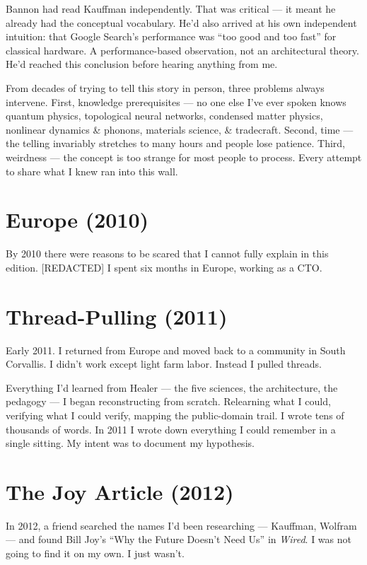 Bannon had read Kauffman independently. That was critical --- it meant he already had the conceptual vocabulary. He'd also arrived at his own independent intuition: that Google Search's performance was ``too good and too fast'' for classical hardware. A performance-based observation, not an architectural theory. He'd reached this conclusion before hearing anything from me.


From decades of trying to tell this story in person, three problems always intervene. First, knowledge prerequisites --- no one else I've ever spoken knows quantum physics, topological neural networks, condensed matter physics, nonlinear dynamics \& phonons, materials science, \& tradecraft. Second, time --- the telling invariably stretches to many hours and people lose patience. Third, weirdness --- the concept is too strange for most people to process. Every attempt to share what I knew ran into this wall.

\section*{Europe (2010)}
\label{pos29:europe}

By 2010 there were reasons to be scared that I cannot fully explain in this edition. [REDACTED] I spent six months in Europe, working as a CTO.

\section*{Thread-Pulling (2011)}
\label{pos29:thread-pulling}

Early 2011. I returned from Europe and moved back to a community in South Corvallis. I didn't work except light farm labor. Instead I pulled threads.

Everything I'd learned from Healer --- the five sciences, the architecture, the pedagogy --- I began reconstructing from scratch. Relearning what I could, verifying what I could verify, mapping the public-domain trail. I wrote tens of thousands of words. In 2011 I wrote down everything I could remember in a single sitting. My intent was to document my hypothesis.

\section*{The Joy Article (2012)}
\label{pos29:the-joy-article}

In 2012, a friend searched the names I'd been researching --- Kauffman, Wolfram --- and found Bill Joy's ``Why the Future Doesn't Need Us'' in \textit{Wired}. I was not going to find it on my own. I just wasn't.


